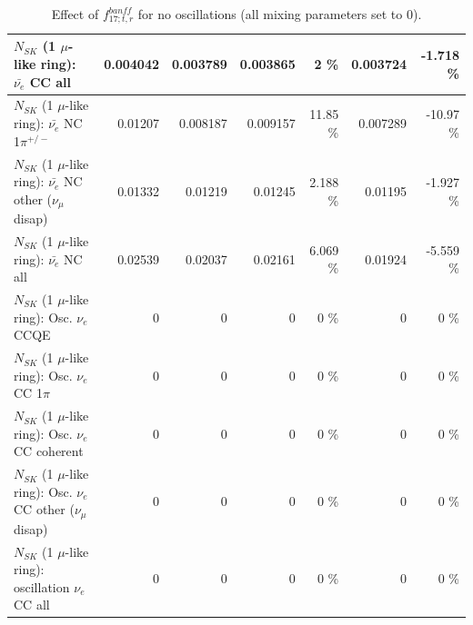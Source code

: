\begin{table}
\begin{tabular}{| l | r | r | r  r | r  r |}
                            $N_{SK}$ (1 $\mu$-like ring): $\bar{\nu_{e}}$ CC all &        0.004042 &        0.003789 &        0.003865 &        2 \%  &        0.003724 &   -1.718 \%  \\ 
\hline
                     $N_{SK}$ (1 $\mu$-like ring): $\bar{\nu_e}$ NC 1$\pi^{+/-}$ &         0.01207 &        0.008187 &        0.009157 &    11.85 \%  &        0.007289 &   -10.97 \%  \\ 
          $N_{SK}$ (1 $\mu$-like ring): $\bar{\nu_e}$ NC other ($\nu_\mu$ disap) &         0.01332 &         0.01219 &         0.01245 &    2.188 \%  &         0.01195 &   -1.927 \%  \\ 
                            $N_{SK}$ (1 $\mu$-like ring): $\bar{\nu_{e}}$ NC all &         0.02539 &         0.02037 &         0.02161 &    6.069 \%  &         0.01924 &   -5.559 \%  \\ 
\hline
\hline
\hline
                                 $N_{SK}$ (1 $\mu$-like ring): Osc. $\nu_e$ CCQE &               0 &               0 &               0 &        0 \%  &               0 &        0 \%  \\ 
                            $N_{SK}$ (1 $\mu$-like ring): Osc. $\nu_e$ CC 1$\pi$ &               0 &               0 &               0 &        0 \%  &               0 &        0 \%  \\ 
                          $N_{SK}$ (1 $\mu$-like ring): Osc. $\nu_e$ CC coherent &               0 &               0 &               0 &        0 \%  &               0 &        0 \%  \\ 
           $N_{SK}$ (1 $\mu$-like ring): Osc. $\nu_e$ CC other ($\nu_\mu$ disap) &               0 &               0 &               0 &        0 \%  &               0 &        0 \%  \\ 
                        $N_{SK}$ (1 $\mu$-like ring): oscillation $\nu_e$ CC all &               0 &               0 &               0 &        0 \%  &               0 &        0 \%  \\ 
\hline
\hline
\end{tabular}
\caption{ Effect of $f_{17; t, r}^{banff}$ for no oscillations (all mixing parameters set to 0). }
\label{tab:num_banff_mares_1RmuT_3f_osc_t13:0}
\end{table}
\clearpage
